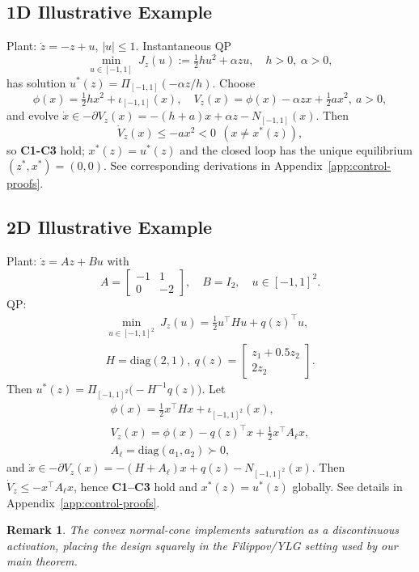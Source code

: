 \documentclass[journal]{IEEEtran}
\newtheorem{remark}{Remark}
\begin{document}
\subsection{1D Illustrative Example}\label{subsec:illustrative-example-control}
Plant: \(\dot z=-z+u\), \(|u|\le 1\). Instantaneous QP
\begin{equation}\label{eq:ex-qp}
  \min_{u\in[-1,1]}\ J_z(u):=\tfrac12 h u^2 + \alpha z u, \quad h>0,\ \alpha>0,
\end{equation}
has solution \(u^\ast(z)=\Pi_{[-1,1]}(-\alpha z/h)\).
Choose
\[
  \phi(x)=\tfrac12 h x^2 + \iota_{[-1,1]}(x),\quad
  V_z(x)=\phi(x)-\alpha zx+\tfrac12 a x^2,\ a>0,
\]
and evolve \(\dot x\in -\partial V_z(x) = -(h+a)x+\alpha z - N_{[-1,1]}(x)\).
Then
\[
  \dot V_z(x)\le -a x^2<0\ \ (x\neq x^\ast(z)),
\]
so \textbf{C1-C3} hold; \(x^\ast(z)=u^\ast(z)\) 
and the closed loop has the unique equilibrium \((z^\ast,x^\ast)=(0,0)\). 
See corresponding derivations in Appendix~\ref{app:control-proofs}.

\subsection{2D Illustrative Example}\label{subsec:2d-example-control}
Plant: \(\dot z = Az+Bu\) with
\[
A=\begin{bmatrix}-1&1\\0&-2\end{bmatrix},\quad
B=I_2,\quad u\in[-1,1]^2.
\]
QP:
\begin{multline*}    
  \min_{u\in[-1,1]^2}\ J_z(u)=\tfrac12 u^\top H u + q(z)^\top u, \\
  H=\mathrm{diag}(2,1),\ 
  q(z)=\begin{bmatrix}z_1+0.5 z_2\\ 2z_2\end{bmatrix}.
\end{multline*}
Then \(u^\ast(z)=\Pi_{[-1,1]^2}\big(-H^{-1}q(z)\big)\).
Let
\begin{multline*}
  \phi(x)=\tfrac12 x^\top Hx+\iota_{[-1,1]^2}(x),\\
  V_z(x)=\phi(x)-q(z)^\top x+\tfrac12 x^\top A_\ell x,\\ 
  A_\ell=\mathrm{diag}(a_1,a_2)\succ0,
\end{multline*}
and \(\dot x\in -\partial V_z(x)=-(H+A_\ell)x+q(z)-N_{[-1,1]^2}(x)\).
Then \(\dot V_z\le -x^\top A_\ell x\), hence \textbf{C1--C3} hold and \(x^\ast(z)=u^\ast(z)\) globally. 
See details in Appendix~\ref{app:control-proofs}.
\begin{remark}
The convex normal-cone implements saturation as a discontinuous activation, placing the design squarely in the Filippov/YLG setting used by our main theorem.
\end{remark}
\todo[inline]{New above}
\end{document}

